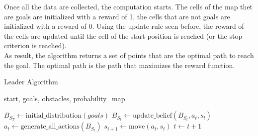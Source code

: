 \documentclass[journal,article,submit,pdftex,moreauthors]{Definitions/mdpi}
\begin{document}
Once all the data are collected, the computation starts. The cells of the map thet are goals are initialized with a reward of 1, the cells that are not goals are initialized with a reward of 0.
Using the update rule seen before, the reward of the cells are updated until the cell of the start position is reached (or the stop criterion is reached).\\
As result, the algorithm returns a set of points that are the optimal path to reach the goal. The optimal path is the path that maximizes the reward function.\\

\begin{algorithm}
    \caption{Leader Algorithm}\label{alg:leader}
    \begin{algorithmic}
        \Require start, goals, obstacles, probability\_map
        
        \State $B_{S_T} \gets \text{initial\_distribution}(goals)$
			\State $B_{S_t} \gets \text{update\_belief}(B_{S_t}, a_t, s_t)$
			\State $a_t \gets \text{generate\_all\_actions}(B_{S_t})$
			\State $s_{t + 1} \gets \text{move}(a_t, s_t)$
			\State $t \gets t + 1$
        
        
        
            
              
          
        
          
        

\end{algorithmic}
\end{algorithm}
\end{document}
